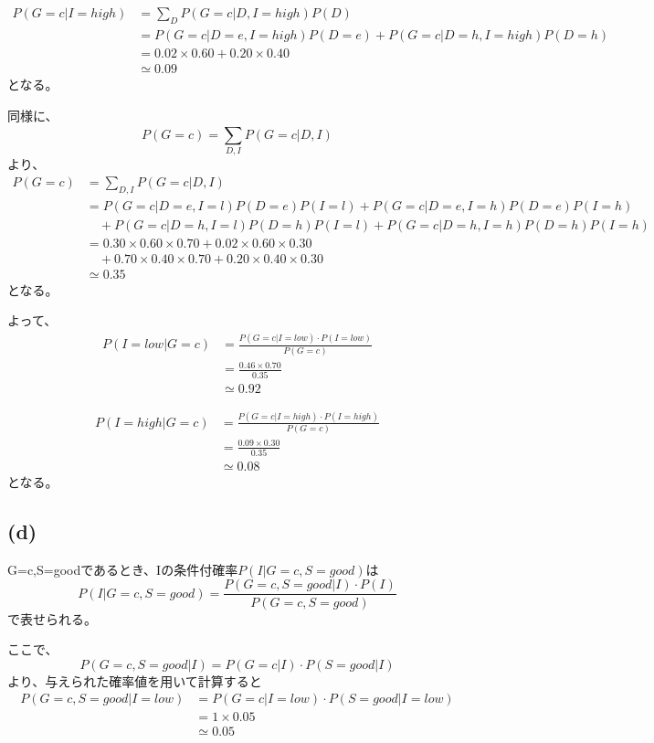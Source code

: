 \documentclass[a4paper,11pt,dvipdfmx]{jsarticle}
\begin{document}
\begin{align*}
    P(G=c|I = high)    &= \sum_{D}^{}P(G=c|D,I = high)P(D)\\
                &= P(G=c|D=e,I = high)P(D=e) + P(G=c|D=h,I = high)P(D=h)\\
                &= 0.02 \times 0.60 + 0.20 \times 0.40\\
                &\simeq 0.09
\end{align*}
となる。

同様に、
\[P(G=c) = \sum_{D,I}^{}P(G=c|D,I)\]
より、
\begin{align*}
    P(G=c)  &= \sum_{D,I}^{}P(G=c|D,I)\\
            &= P(G=c|D=e,I=l)P(D=e)P(I=l) + P(G=c|D=e,I=h)P(D=e)P(I=h)\\
            &\quad + P(G=c|D=h,I=l)P(D=h)P(I=l) + P(G=c|D=h,I=h)P(D=h)P(I=h)\\
            &= 0.30 \times 0.60 \times 0.70 + 0.02 \times 0.60 \times 0.30\\
            &\quad + 0.70 \times 0.40 \times 0.70 + 0.20 \times 0.40 \times 0.30\\
            &\simeq 0.35
\end{align*}
となる。

よって、
\begin{align*}
    P(I = low|G=c)    &= \frac{P(G=c|I = low) \cdot P(I = low)}{P(G=c)}\\
                &= \frac{0.46 \times 0.70}{0.35}\\
                &\simeq 0.92
\end{align*}

\begin{align*}
    P(I = high|G=c)    &= \frac{P(G=c|I = high) \cdot P(I = high)}{P(G=c)}\\
                &= \frac{0.09 \times 0.30}{0.35}\\
                &\simeq 0.08
\end{align*}
となる。

\subsection*{(d)}
G=c,S=goodであるとき、Iの条件付確率$P(I|G=c,S=good)$は
\[P(I|G=c,S=good)=\frac{P(G=c,S=good|I) \cdot P(I)}{P(G=c,S=good)}\]
で表せられる。

ここで、
\[P(G=c,S=good|I) = P(G=c|I) \cdot P(S=good|I)\]
より、与えられた確率値を用いて計算すると
\begin{align*}
    P(G=c,S=good|I = low)    &= P(G=c|I = low) \cdot P(S=good|I = low)\\
                                &= 1 \times 0.05\\
                                &\simeq 0.05
\end{align*}
\end{document}
